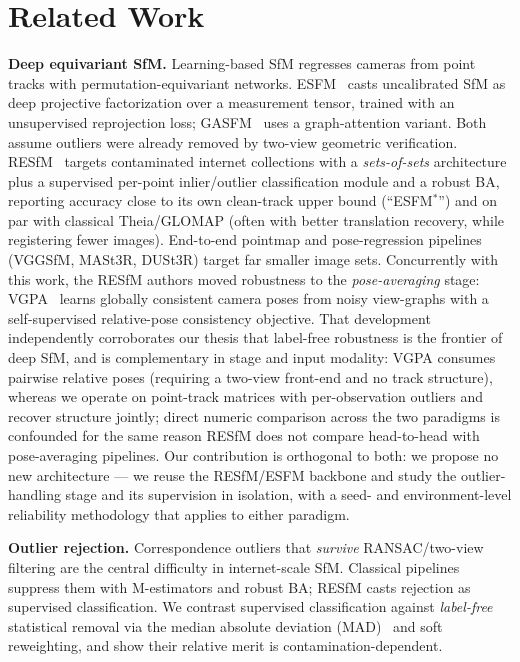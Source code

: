 \documentclass{article}
\begin{document}
\section{Related Work}
\textbf{Deep equivariant SfM.} Learning-based SfM regresses cameras from point tracks with
permutation-equivariant networks. ESFM~\citep{esfm} casts uncalibrated SfM as deep projective
factorization over a measurement tensor, trained with an unsupervised reprojection loss;
GASFM~\citep{gasfm} uses a graph-attention variant. Both assume outliers were already removed
by two-view geometric verification. RESfM~\citep{resfm} targets contaminated internet
collections with a \emph{sets-of-sets} architecture plus a supervised per-point
inlier/outlier classification module and a robust BA, reporting accuracy close to its own
clean-track upper bound (``ESFM$^\ast$'') and on par with classical Theia/GLOMAP
(often with better translation recovery, while registering fewer images).
End-to-end pointmap and pose-regression pipelines (VGGSfM, MASt3R, DUSt3R) target far
smaller image sets. Concurrently with this work, the RESfM authors moved robustness to
the \emph{pose-averaging} stage: VGPA~\citep{vgpa} learns globally consistent camera
poses from noisy view-graphs with a self-supervised relative-pose consistency objective.
That development independently corroborates our thesis that label-free robustness is the
frontier of deep SfM, and is complementary in stage and input modality: VGPA consumes
pairwise relative poses (requiring a two-view front-end and no track structure), whereas
we operate on point-track matrices with per-observation outliers and recover structure
jointly; direct numeric comparison across the two paradigms is confounded for the same
reason RESfM does not compare head-to-head with pose-averaging pipelines. Our
contribution is orthogonal to both: we propose no new architecture --- we reuse the
RESfM/ESFM backbone and study the outlier-handling stage and its supervision in
isolation, with a seed- and environment-level reliability methodology that applies to
either paradigm.

\noindent\textbf{Outlier rejection.} Correspondence outliers that \emph{survive}
RANSAC/two-view filtering are the central difficulty in internet-scale SfM. Classical
pipelines suppress them with M-estimators and robust BA; RESfM casts rejection as
supervised classification. We contrast supervised classification against \emph{label-free}
statistical removal via the median absolute deviation (MAD)~\citep{mad} and soft
reweighting, and show their relative merit is contamination-dependent.
\end{document}
